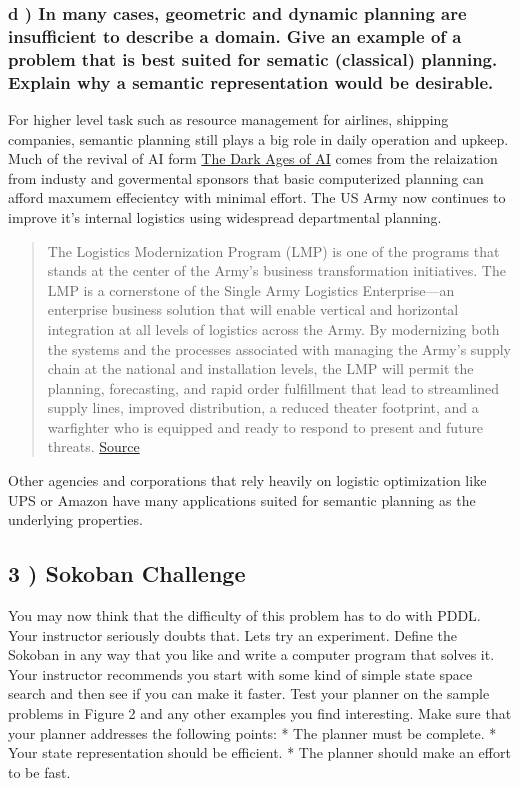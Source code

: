 \documentclass{article}
\begin{document}
    \subsubsection{d ) In many cases, geometric and dynamic planning are insufficient to
describe a domain. Give an example of a problem that is best suited for
sematic (classical) planning. Explain why a semantic representation
would be desirable.}


    For higher level task such as resource management for airlines, shipping
companies, semantic planning still plays a big role in daily operation
and upkeep. Much of the revival of AI form
\href{http://www.aaai.org/ojs/index.php/aimagazine/article/view/494}{The
Dark Ages of AI} comes from the relaization from industy and govermental
sponsors that basic computerized planning can afford maxumem effecientcy
with minimal effort. The US Army now continues to improve it's internal
logistics using widespread departmental planning.

\begin{quote}
The Logistics Modernization Program (LMP) is one of the programs that
stands at the center of the Army's business transformation initiatives.
The LMP is a cornerstone of the Single Army Logistics Enterprise---an
enterprise business solution that will enable vertical and horizontal
integration at all levels of logistics across the Army. By modernizing
both the systems and the processes associated with managing the Army's
supply chain at the national and installation levels, the LMP will
permit the planning, forecasting, and rapid order fulfillment that lead
to streamlined supply lines, improved distribution, a reduced theater
footprint, and a warfighter who is equipped and ready to respond to
present and future threats.
\href{http://www.almc.army.mil/alog/issues/janfeb07/lmp_cornerstone.html}{Source}
\end{quote}

Other agencies and corporations that rely heavily on logistic
optimization like UPS or Amazon have many applications suited for
semantic planning as the underlying properties.


    \subsection{3 ) Sokoban Challenge}


    You may now think that the difficulty of this problem has to do with
PDDL. Your instructor seriously doubts that. Lets try an experiment.
Define the Sokoban in any way that you like and write a computer program
that solves it. Your instructor recommends you start with some kind of
simple state space search and then see if you can make it faster. Test
your planner on the sample problems in Figure 2 and any other examples
you find interesting. Make sure that your planner addresses the
following points: * The planner must be complete. * Your state
representation should be efficient. * The planner should make an effort
to be fast.
\end{document}
